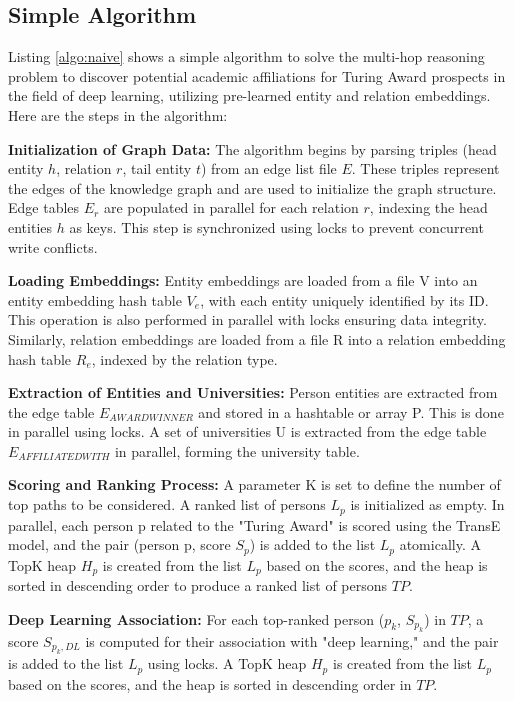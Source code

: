 \documentclass[sigconf]{acmart}
\begin{document}
\subsection{Simple Algorithm}
Listing \ref{algo:naive} shows a simple algorithm to solve the multi-hop reasoning problem to discover potential academic affiliations for Turing Award prospects in the field of deep learning, utilizing pre-learned entity and relation embeddings. Here are the steps in the algorithm:

{\bf{Initialization of Graph Data:}} The algorithm begins by parsing triples (head entity $h$, relation $r$, tail entity $t$) from an edge list file $E$. These triples represent the edges of the knowledge graph and are used to initialize the graph structure. Edge tables $E_r$ are populated in parallel for each relation $r$, indexing the head entities $h$ as keys. This step is synchronized using locks to prevent concurrent write conflicts.

{\bf{Loading Embeddings:}} Entity embeddings are loaded from a file V into an entity embedding hash table $V_e$, with each entity uniquely identified by its ID. This operation is also performed in parallel with locks ensuring data integrity. Similarly, relation embeddings are loaded from a file R into a relation embedding hash table $R_e$, indexed by the relation type.

{\bf{Extraction of Entities and Universities:}} Person entities are extracted from the edge table $E_{AWARD WINNER}$ and stored in a hashtable or array P. This is done in parallel using locks. A set of universities U is extracted from the edge table $E_{AFFILIATED WITH}$ in parallel, forming the university table.

{\bf{Scoring and Ranking Process:}} A parameter K is set to define the number of top paths to be considered. A ranked list of persons $L_p$ is initialized as empty. In parallel, each person p related to the "Turing Award" is scored using the TransE model, and the pair (person p, score $S_p$) is added to the list $L_p$ atomically. A TopK heap $H_p$ is created from the list $L_p$ based on the scores, and the heap is sorted in descending order to produce a ranked list of persons $TP$.

{\bf{Deep Learning Association:}} For each top-ranked person ($p_k$, $S_{p_k}$) in $TP$, a score $S_{p_k, DL}$ is computed for their association with "deep learning," and the pair is added to the list $L_p$ using locks. A TopK heap $H_p$ is created from the list $L_p$ based on the scores, and the heap is sorted in descending order in $TP$. 
\end{document}
